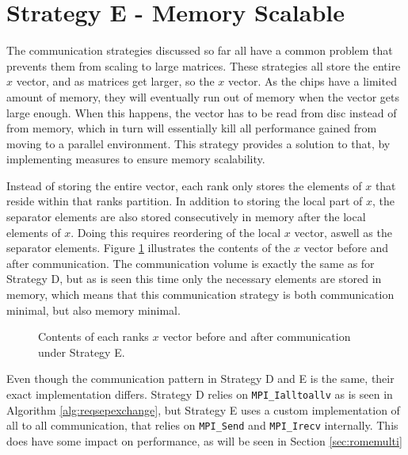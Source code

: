 \section{Strategy E - Memory Scalable}
\label{sec:memscal}
The communication strategies discussed so far all have a common problem that prevents them from scaling to large matrices. These strategies all store the entire \(x\) vector, and as matrices get larger, so the \(x\) vector. As the chips have a limited amount of memory, they will eventually run out of memory when the vector gets large enough. When this happens, the vector has to be read from disc instead of from memory, which in turn will essentially kill all performance gained from moving to a parallel environment. This strategy provides a solution to that, by implementing measures to ensure memory scalability.
\medskip


Instead of storing the entire vector, each rank only stores the elements of \(x\) that reside within that ranks partition. In addition to storing the local part of \(x\), the separator elements are also stored consecutively in memory after the local elements of \(x\). Doing this requires reordering of the local \(x\) vector, aswell as the separator elements. Figure \ref{fig:2dcomm} illustrates the contents of the \(x\) vector before and after communication. The communication volume is exactly the same as for Strategy D, but as is seen this time only the necessary elements are stored in memory, which means that this communication strategy is both communication minimal, but also memory minimal.
\medskip

\begin{figure}[H]
    \centering
    \caption{Contents of each ranks \(x\) vector before and after communication under Strategy E.}
    \label{fig:2dcomm}
\end{figure}

Even though the communication pattern in Strategy D and E is the same, their exact implementation differs. Strategy D relies on \texttt{MPI\_Ialltoallv} as is seen in Algorithm \ref{alg:reqsepexchange}, but Strategy E uses a custom implementation of all to all communication, that relies on \texttt{MPI\_Send} and \texttt{MPI\_Irecv} internally. This does have some impact on performance, as will be seen in Section \ref{sec:romemulti}
\medskip


